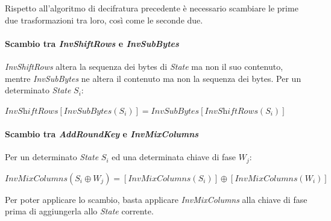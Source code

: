 \documentclass[a4paper,11pt]{article}
\begin{document}
Rispetto all'algoritmo di decifratura precedente è necessario scambiare le prime due trasformazioni tra loro, così come le seconde due.
\paragraph{Scambio tra \textit{InvShiftRows} e \textit{InvSubBytes}} \textit{InvShiftRows} altera la sequenza dei bytes di \textit{State} ma non il suo contenuto, mentre \textit{InvSubBytes} ne altera il contenuto ma non la sequenza dei bytes. Per un determinato \textit{State} $S_i$: 
\begin{center}
    $\textit{InvShiftRows}[\textit{InvSubBytes}(S_i)] = \textit{InvSubBytes}[\textit{InvShiftRows}(S_i)]$
\end{center} 
\paragraph{Scambio tra \textit{AddRoundKey} e \textit{InvMixColumns}} Per un determinato \textit{State} $S_i$ ed una determinata chiave di fase $W_j$:
\begin{center}
    $\textit{InvMixColumns}(S_i \oplus W_j) = [\textit{InvMixColumns}(S_i)] \oplus [\textit{InvMixColumns}(W_i)]$
\end{center}

Per poter applicare lo scambio, basta applicare \textit{InvMixColumns} alla chiave di fase prima di aggiungerla allo \textit{State} corrente.
\end{document}
